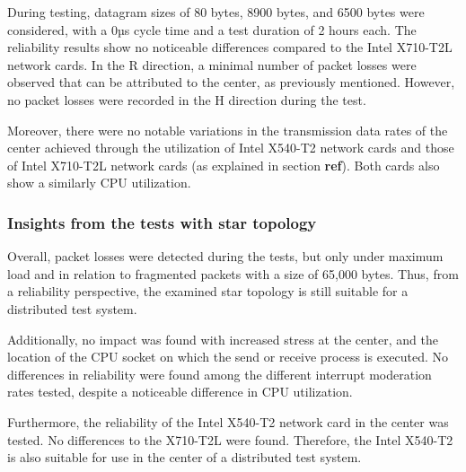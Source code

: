 \documentclass[	a4paper,
				11pt,
				DIV=11,
				bigheadings,
				idxtotoc,
				listof=totoc,	
				bibtotoc,		
				halfparskip,
				cleardoubleempty,
				oneside,
				openright]{scrartcl}
\begin{document}
During testing, datagram sizes of 80 bytes, 8900 bytes, and 6500 bytes were considered, with a 0µs cycle time and a test duration of 2 hours each. The reliability results show no noticeable differences compared to the Intel X710-T2L network cards. In the R direction, a minimal number of packet losses were observed that can be attributed to the center, as previously mentioned. However, no packet losses were recorded in the H direction during the test.

Moreover, there were no notable variations in the transmission data rates of the center achieved through the utilization of Intel X540-T2 network cards and those of Intel X710-T2L network cards (as explained in section \textbf{ref}). Both cards also show a similarly CPU utilization.


\subsubsection{Insights from the tests with star topology}

Overall, packet losses were detected during the tests, but only under maximum load and in relation to fragmented packets with a size of 65,000 bytes. Thus, from a reliability perspective, the examined star topology is still suitable for a distributed test system.

Additionally, no impact was found with increased stress at the center, and the location of the CPU socket on which the send or receive process is executed. No differences in reliability were found among the different interrupt moderation rates tested, despite a noticeable difference in CPU utilization.

Furthermore, the reliability of the Intel X540-T2 network card in the center was tested. No differences to the X710-T2L were found. Therefore, the Intel X540-T2 is also suitable for use in the center of a distributed test system.
\end{document}
